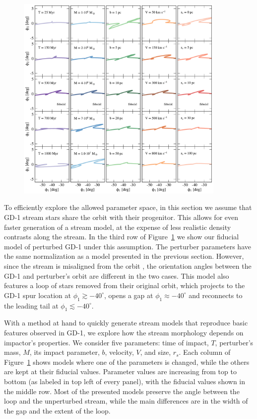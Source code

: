 \documentclass[twocolumn]{aastex62}
\begin{document}
\begin{figure}
\begin{center}
\includegraphics[width=0.9\textwidth]{excursions.pdf}
\end{center}
\caption{}
\label{fig:scalings}
\end{figure}

To efficiently explore the allowed parameter space, in this section we assume that GD-1 stream stars share the orbit with their progenitor.
This allows for even faster generation of a stream model, at the expense of less realistic density contrasts along the stream.
In the third row of Figure~\ref{fig:scalings} we show our fiducial model of perturbed GD-1 under this assumption.
The perturber parameters have the same normalization as a model presented in the previous section.
However, since the stream is misaligned from the orbit \citep{sb2013}, the orientation angles between the GD-1 and perturber's orbit are different in the two cases.
This model also features a loop of stars removed from their original orbit, which projects to the GD-1 spur location at $\phi_1\gtrsim-40^\circ$, opens a gap at $\phi_1\approx-40^\circ$ and reconnects to the leading tail at $\phi_1\lesssim-40^\circ$.

With a method at hand to quickly generate stream models that reproduce basic features observed in GD-1, we explore how the stream morphology depends on impactor's properties.
We consider five parameters: time of impact, $T$, perturber's mass, $M$, its impact parameter, $b$, velocity, $V$, and size, $r_s$.
Each column of Figure~\ref{fig:scalings} shows models where one of the parameters is changed, while the others are kept at their fiducial values.
Parameter values are increasing from top to bottom (as labeled in top left of every panel), with the fiducial values shown in the middle row.
Most of the presented models preserve the angle between the loop and the unperturbed stream, while the main differences are in the width of the gap and the extent of the loop.
\end{document}
